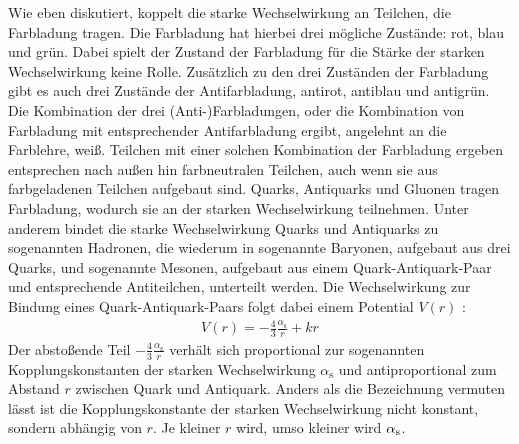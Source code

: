Wie eben diskutiert, koppelt die starke Wechselwirkung an Teilchen, die Farbladung tragen.
Die Farbladung hat hierbei drei m\"ogliche Zust\"ande: rot, blau und gr\"un.
Dabei spielt der Zustand der Farbladung f\"ur die St\"arke der starken Wechselwirkung keine Rolle.
Zus\"atzlich zu den drei Zust\"anden der Farbladung gibt es auch drei Zust\"ande der Antifarbladung, antirot, antiblau und antigr\"un.
\newline
Die Kombination der drei (Anti-)Farbladungen, oder die Kombination von Farbladung mit entsprechender Antifarbladung ergibt, angelehnt an die Farblehre, wei{\ss}.
Teilchen mit einer solchen Kombination der Farbladung ergeben entsprechen nach au{\ss}en hin farbneutralen Teilchen, auch wenn sie aus farbgeladenen Teilchen aufgebaut sind.
\newline
Quarks, Antiquarks und Gluonen tragen Farbladung, wodurch sie an der starken Wechselwirkung teilnehmen.
Unter anderem bindet die starke Wechselwirkung Quarks und Antiquarks zu sogenannten Hadronen, die wiederum in sogenannte Baryonen, aufgebaut aus drei Quarks, und sogenannte Mesonen, aufgebaut aus einem Quark-Antiquark-Paar und entsprechende Antiteilchen, unterteilt werden.
\newline
Die Wechselwirkung zur Bindung eines Quark-Antiquark-Paars folgt dabei einem Potential $V(r)$ \cite{script:kt1}:
\begin{align} \label{eq:Potential}
V(r) = -\frac{4}{3}\frac{\alpha_\text{s}}{r} + kr 
\end{align}
Der absto{\ss}ende Teil $-\frac{4}{3}\frac{\alpha_\text{s}}{r}$ verh\"alt sich proportional zur sogenannten Kopplungskonstanten der starken Wechselwirkung $\alpha_{\text{s}}$ und antiproportional zum Abstand $r$ zwischen Quark und Antiquark.
Anders als die Bezeichnung vermuten l\"asst ist die Kopplungskonstante der starken Wechselwirkung nicht konstant, sondern abh\"angig von $r$.
Je kleiner $r$ wird, umso kleiner wird $\alpha_{\rm{s}}$.
